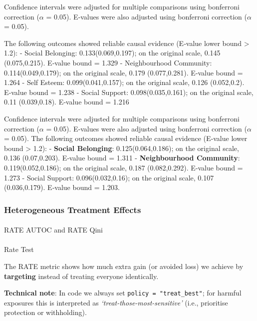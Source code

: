 \documentclass[
  single column]{article}
\makeatletter
\let\oldparagraph\paragraph
\renewcommand{\paragraph}{
    \@ifstar
      \xxxParagraphStar
      \xxxParagraphNoStar
  }
\newcommand{\xxxParagraphStar}[1]{\oldparagraph*{#1}\mbox{}}
\newcommand{\xxxParagraphNoStar}[1]{\oldparagraph{#1}\mbox{}}
\makeatother
\begin{document}
\begin{longtable}[]
\end{longtable}

Confidence intervals were adjusted for multiple comparisons using
bonferroni correction (\(\alpha\) = 0.05). E‑values were also adjusted
using bonferroni correction (\(\alpha\) = 0.05).

The following outcomes showed reliable causal evidence (E‑value lower
bound \textgreater{} 1.2): - Social Belonging: 0.133(0.069,0.197); on
the original scale, 0.145 (0.075,0.215). E‑value bound = 1.329 -
Neighbourhood Community: 0.114(0.049,0.179); on the original scale,
0.179 (0.077,0.281). E‑value bound = 1.264 - Self Esteem:
0.099(0.041,0.157); on the original scale, 0.126 (0.052,0.2). E‑value
bound = 1.238 - Social Support: 0.098(0.035,0.161); on the original
scale, 0.11 (0.039,0.18). E‑value bound = 1.216

Confidence intervals were adjusted for multiple comparisons using
bonferroni correction (\(\alpha\) = 0.05). E‑values were also adjusted
using bonferroni correction (\(\alpha\) = 0.05). The following outcomes
showed reliable causal evidence (E‑value lower bound \textgreater{}
1.2): - \textbf{Social Belonging}: 0.125(0.064,0.186); on the original
scale, 0.136 (0.07,0.203). E‑value bound = 1.311 - \textbf{Neighbourhood
Community}: 0.119(0.052,0.186); on the original scale, 0.187
(0.082,0.292). E‑value bound = 1.273 - Social Support:
0.096(0.032,0.16); on the original scale, 0.107 (0.036,0.179). E‑value
bound = 1.203.

\newpage{}

\subsubsection{Heterogeneous Treatment
Effects}\label{heterogeneous-treatment-effects}

\paragraph{RATE AUTOC and RATE Qini}\label{rate-autoc-and-rate-qini}

\paragraph{Rate Test}\label{rate-test}

The RATE metric shows how much extra gain (or avoided loss) we achieve
by \textbf{targeting} instead of treating everyone identically.

\textbf{Technical note}: In code we always set
\texttt{policy\ =\ "treat\_best"}; for harmful exposures this is
interpreted as \emph{`treat-those-most-sensitive'} (i.e., prioritise
protection or withholding).
\end{document}

